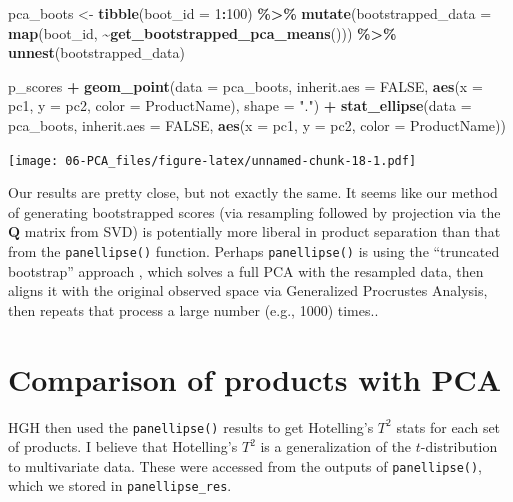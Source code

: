 \documentclass[
]{book}
\newenvironment{Shaded}{\begin{snugshade}}{\end{snugshade}}
\newcommand{\AttributeTok}[1]{\textcolor[rgb]{0.13,0.29,0.53}{#1}}
\newcommand{\ConstantTok}[1]{\textcolor[rgb]{0.56,0.35,0.01}{#1}}
\newcommand{\DecValTok}[1]{\textcolor[rgb]{0.00,0.00,0.81}{#1}}
\newcommand{\FunctionTok}[1]{\textcolor[rgb]{0.13,0.29,0.53}{\textbf{#1}}}
\newcommand{\NormalTok}[1]{#1}
\newcommand{\OtherTok}[1]{\textcolor[rgb]{0.56,0.35,0.01}{#1}}
\newcommand{\SpecialCharTok}[1]{\textcolor[rgb]{0.81,0.36,0.00}{\textbf{#1}}}
\newcommand{\StringTok}[1]{\textcolor[rgb]{0.31,0.60,0.02}{#1}}
\begin{document}
\begin{Shaded}
\begin{Highlighting}[]
\NormalTok{pca\_boots }\OtherTok{\textless{}{-}} 
  \FunctionTok{tibble}\NormalTok{(}\AttributeTok{boot\_id =} \DecValTok{1}\SpecialCharTok{:}\DecValTok{100}\NormalTok{) }\SpecialCharTok{\%\textgreater{}\%}
  \FunctionTok{mutate}\NormalTok{(}\AttributeTok{bootstrapped\_data =} \FunctionTok{map}\NormalTok{(boot\_id, }\SpecialCharTok{\textasciitilde{}}\FunctionTok{get\_bootstrapped\_pca\_means}\NormalTok{())) }\SpecialCharTok{\%\textgreater{}\%}
  \FunctionTok{unnest}\NormalTok{(bootstrapped\_data)}

\NormalTok{p\_scores }\SpecialCharTok{+}
  \FunctionTok{geom\_point}\NormalTok{(}\AttributeTok{data =}\NormalTok{ pca\_boots, }
             \AttributeTok{inherit.aes =} \ConstantTok{FALSE}\NormalTok{,}
             \FunctionTok{aes}\NormalTok{(}\AttributeTok{x =}\NormalTok{ pc1, }\AttributeTok{y =}\NormalTok{ pc2, }\AttributeTok{color =}\NormalTok{ ProductName), }\AttributeTok{shape =} \StringTok{"."}\NormalTok{) }\SpecialCharTok{+}
  \FunctionTok{stat\_ellipse}\NormalTok{(}\AttributeTok{data =}\NormalTok{ pca\_boots, }\AttributeTok{inherit.aes =} \ConstantTok{FALSE}\NormalTok{,}
               \FunctionTok{aes}\NormalTok{(}\AttributeTok{x =}\NormalTok{ pc1, }\AttributeTok{y =}\NormalTok{ pc2, }\AttributeTok{color =}\NormalTok{ ProductName))}
\end{Highlighting}
\end{Shaded}

\texttt{[image: 06-PCA\_files/figure-latex/unnamed-chunk-18-1.pdf]}

Our results are pretty close, but not exactly the same. It seems like our method of generating bootstrapped scores (via resampling followed by projection via the \(\mathbf Q\) matrix from SVD) is potentially more liberal in product separation than that from the \texttt{panellipse()} function. Perhaps \texttt{panellipse()} is using the ``truncated bootstrap'' approach \citep{cadoretConstruction2013}, which solves a full PCA with the resampled data, then aligns it with the original observed space via Generalized Procrustes Analysis, then repeats that process a large number (e.g., 1000) times..

\section{Comparison of products with PCA}\label{comparison-of-products-with-pca}

HGH then used the \texttt{panellipse()} results to get Hotelling's \(T^2\) stats for each set of products. I believe that Hotelling's \(T^2\) is a generalization of the \(t\)-distribution to multivariate data. These were accessed from the outputs of \texttt{panellipse()}, which we stored in \texttt{panellipse\_res}.
\end{document}

